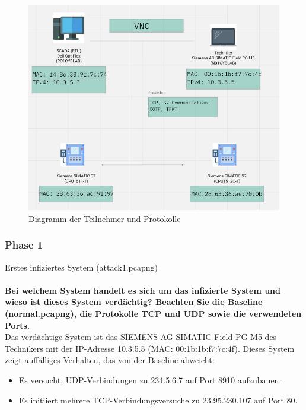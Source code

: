 \documentclass[
    a4paper,
    pagesize,
	pdftex,
    12pt,
]{scrartcl}
\begin{document}
\begin{figure}[H]
	\centering
	\includegraphics[width=\textwidth]{diagramm-teilnehmer.png}
	\caption{Diagramm der Teilnehmer und Protokolle}
	\label{fig:diagramm-teilnehmer}
\end{figure}

\subsubsection{Phase 1}
Erstes infiziertes System (attack1.pcapng)
\\ \\
\textbf{Bei welchem System handelt es sich um das infizierte System und wieso ist dieses System verdächtig? Beachten Sie die Baseline (normal.pcapng), die Protokolle TCP und UDP sowie die verwendeten Ports.}
\\ 
Das verdächtige System ist das SIEMENS AG SIMATIC Field PG M5 des Technikers mit der IP-Adresse 10.3.5.5 (MAC: 00:1b:1b:f7:7c:4f). Dieses System zeigt auffälliges Verhalten, das von der Baseline abweicht:

\begin{itemize}
    \item Es versucht, UDP-Verbindungen zu 234.5.6.7 auf Port 8910 aufzubauen.
    \item Es initiiert mehrere TCP-Verbindungsversuche zu 23.95.230.107 auf Port 80.
\end{itemize}
\end{document}
